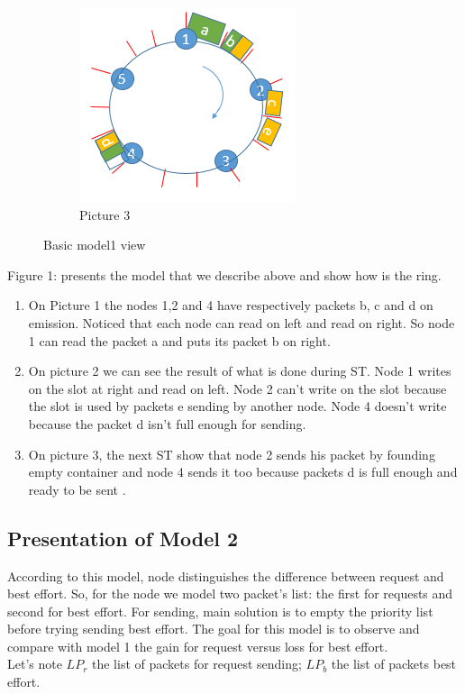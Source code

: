 \documentclass{article}
\begin{document}
\begin{figure}[h!]
\begin{subfigure}[b]{0.5\textwidth}
    \includegraphics[width=\textwidth]{etape3.png}
    \caption{Picture 3}
    \label{fig:3}
  \end{subfigure}
\caption{Basic model1 view}
\end{figure}

\newpage
Figure 1: presents the model that we describe above and show how is the ring.
\begin{enumerate}[label=$\bullet$]
\item On Picture 1 the nodes 1,2 and 4 have respectively packets b, c and d on emission. Noticed that each node can read on left and read on right. So node 1 can read the packet a and puts its packet b on right.   
\item On picture 2 we can see the result of what is done during ST. Node 1 writes  on the slot at right and read on left. Node 2 can't write on the slot because the slot is used by packets e sending by another node. Node 4 doesn't write because the packet d isn't full enough for sending.
\item On picture 3, the next ST show that node 2 sends his packet by founding empty container and node 4 sends it too because packets d is full enough and ready to be sent .
\end{enumerate}

\subsection{Presentation of Model 2}
According to this model, node distinguishes the difference between request and best effort. So, for the node we model two packet's list: the first for requests and second for best effort. For sending, main solution is to empty the priority list before trying sending best effort. The goal for this model is to observe and compare with model 1 the gain for request versus loss for best effort.\\
Let's note $LP_{r}$ the list of packets for request sending; $LP_{b}$ the list of packets best effort.
\end{document}
